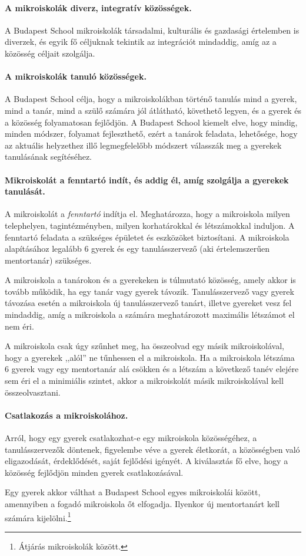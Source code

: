 \paragraph{A mikroiskolák diverz, integratív közösségek.}
A Budapest School mikroiskolák társadalmi, kulturális és gazdasági értelemben is diverzek, és egyik fő céljuknak tekintik az integrációt mindaddig, amíg az a közösség céljait szolgálja.

\paragraph{A mikroiskolák tanuló közösségek.}
A Budapest School célja, hogy a\linebreak
mikroiskolákban történő tanulás mind a gyerek, mind a tanár, mind a szülő számára jól átlátható, követhető legyen, és a gyerek és a közösség folyamatosan fejlődjön. A Budapest School kiemelt elve, hogy mindig, minden módszer, folyamat fejleszthető, ezért a tanárok feladata, lehetősége, hogy az aktuális helyzethez illő legmegfelelőbb módszert válasszák meg a gyerekek tanulásának segítéséhez.

\paragraph{Mikroiskolát a fenntartó indít, és addig él, amíg szolgálja a gyerekek tanulását.}
A mikroiskolát a \emph{fenntartó} indítja el. Meghatározza, hogy a mikroiskola milyen telephelyen, tagintézményben, milyen korhatárokkal és létszámokkal induljon. A fenntartó feladata a szükséges épületet és eszközöket biztosítani. A mikroiskola alapításához legalább 6 gyerek és egy tanulásszervező (aki értelemszerűen mentortanár) szükséges.

A mikroiskola a tanárokon és a gyerekeken is túlmutató
közösség,\linebreak
amely akkor is tovább működik, ha egy tanár vagy gyerek távozik. Tanulásszervező vagy gyerek távozása esetén a mikroiskola  új tanulásszervező tanárt, illetve gyereket vesz fel mindaddig, amíg a mikroiskola a számára meghatározott maximális létszámot el nem éri.

A mikroiskola csak úgy szűnhet meg, ha összeolvad egy másik mikroiskolával, hogy a gyerekek ,,alól'' ne tűnhessen el a mikroiskola. Ha a mikroiskola létszáma 6 gyerek vagy egy mentortanár alá csökken és a létszám a következő tanév elejére sem éri el a minimiális szintet, akkor a mikroiskolát másik mikroiskolával kell összeolvasztani.

\paragraph{Csatlakozás a mikroiskolához.}
Arról, hogy egy gyerek csat\-la\-kozhat-e\linebreak
egy mikroiskola közösségéhez, a tanulásszervezők döntenek, figyelembe véve a gyerek életkorát, a közösségben való eligazodását, érdeklődését, saját fejlődési igényét. A kiválasztás fő elve,  hogy a közösség fejlődjön minden gyerek csatlakozásával.

Egy gyerek akkor válthat a Budapest School egyes mikroiskolái között, amennyiben a fogadó mikroiskola őt elfogadja. Ilyenkor új mentortanárt kell számára kijelölni.\footnote{Átjárás mikroiskolák között.}
